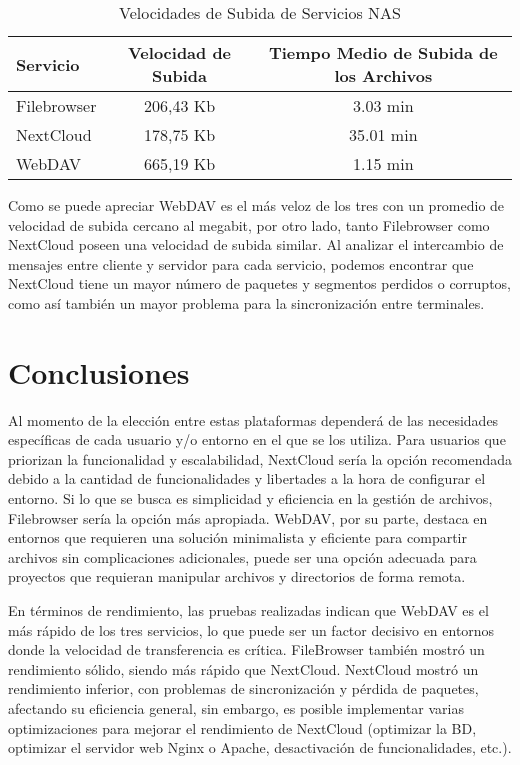 \documentclass[a4paper,10pt]{article}
\begin{document}
	\begin{table}[H]
		\centering
		\caption{Velocidades de Subida de Servicios NAS}
		\label{tabla:velocidades_subida}
		\begin{tabular}{|l|c|c|}
			\hline
			\textbf{Servicio} & \textbf{Velocidad de Subida} & \textbf{Tiempo Medio de Subida de los Archivos} \\
			\hline
			Filebrowser & 206,43 Kb & 3.03 min \\
			\hline
			NextCloud & 178,75 Kb & 35.01 min \\
			\hline
			WebDAV & 665,19 Kb & 1.15 min \\
			\hline
		\end{tabular}
	\end{table}
	
	Como se puede apreciar WebDAV es el más veloz de los tres con un promedio de velocidad de subida cercano al megabit, por otro lado, tanto Filebrowser como NextCloud poseen una velocidad de subida similar. Al analizar el intercambio de mensajes entre cliente y servidor para cada servicio, podemos encontrar que NextCloud tiene un mayor número de paquetes y segmentos perdidos o corruptos, como así también un mayor problema para la sincronización entre terminales.
	
	\section{Conclusiones}
	Al momento de la elección entre estas plataformas dependerá de las necesidades específicas de cada usuario y/o entorno en el que se los utiliza. Para usuarios que priorizan la funcionalidad y escalabilidad, NextCloud sería la opción recomendada debido a la cantidad de funcionalidades y libertades a la hora de configurar el entorno. Si lo que se busca es simplicidad y eficiencia en la gestión de archivos, Filebrowser sería la opción más apropiada. WebDAV, por su parte, destaca en entornos que requieren una solución minimalista y eficiente para compartir archivos sin complicaciones adicionales, puede ser una opción adecuada para proyectos que requieran manipular archivos y directorios de forma remota.
	
	En términos de rendimiento, las pruebas realizadas indican que WebDAV es el más rápido de los tres servicios, lo que puede ser un factor decisivo en entornos donde la velocidad de transferencia es crítica. FileBrowser también mostró un rendimiento sólido, siendo más rápido que NextCloud. NextCloud mostró un rendimiento inferior, con problemas de sincronización y pérdida de paquetes, afectando su eficiencia general, sin embargo, es posible implementar varias optimizaciones para mejorar el rendimiento de NextCloud (optimizar la BD, optimizar el servidor web Nginx o Apache, desactivación de funcionalidades, etc.).
	
\end{document}
